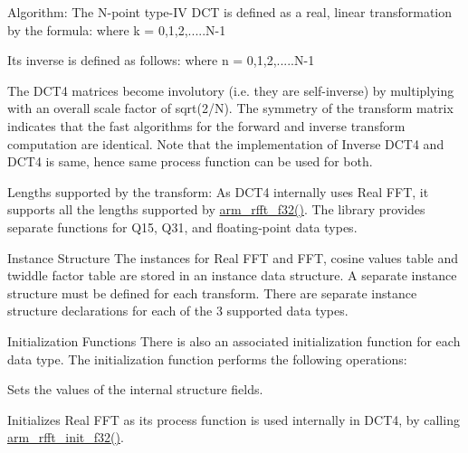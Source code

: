 \begin{DoxyParagraph}{Algorithm\-: }
The N-\/point type-\/\-I\-V D\-C\-T is defined as a real, linear transformation by the formula\-:  where {\ttfamily k = 0,1,2,.....N-\/1} 
\end{DoxyParagraph}
\begin{DoxyParagraph}{}
Its inverse is defined as follows\-:  where {\ttfamily n = 0,1,2,.....N-\/1} 
\end{DoxyParagraph}
\begin{DoxyParagraph}{}
The D\-C\-T4 matrices become involutory (i.\-e. they are self-\/inverse) by multiplying with an overall scale factor of sqrt(2/\-N). The symmetry of the transform matrix indicates that the fast algorithms for the forward and inverse transform computation are identical. Note that the implementation of Inverse D\-C\-T4 and D\-C\-T4 is same, hence same process function can be used for both.
\end{DoxyParagraph}
\begin{DoxyParagraph}{Lengths supported by the transform\-: }
As D\-C\-T4 internally uses Real F\-F\-T, it supports all the lengths supported by \hyperlink{group___r_f_f_t___r_i_f_f_t_ga3df1766d230532bc068fc4ed69d0fcdc}{arm\-\_\-rfft\-\_\-f32()}. The library provides separate functions for Q15, Q31, and floating-\/point data types. 
\end{DoxyParagraph}
\begin{DoxyParagraph}{Instance Structure }
The instances for Real F\-F\-T and F\-F\-T, cosine values table and twiddle factor table are stored in an instance data structure. A separate instance structure must be defined for each transform. There are separate instance structure declarations for each of the 3 supported data types.
\end{DoxyParagraph}
\begin{DoxyParagraph}{Initialization Functions }
There is also an associated initialization function for each data type. The initialization function performs the following operations\-:
\begin{DoxyItemize}
\item Sets the values of the internal structure fields.
\item Initializes Real F\-F\-T as its process function is used internally in D\-C\-T4, by calling \hyperlink{group___r_f_f_t___r_i_f_f_t_ga10717ee326bf50832ef1c25b85a23068}{arm\-\_\-rfft\-\_\-init\-\_\-f32()}. 
\end{DoxyItemize}
\end{DoxyParagraph}
